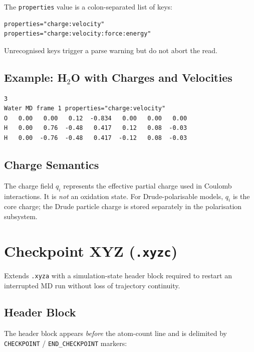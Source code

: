 \documentclass[12pt, a4paper, oneside]{article}
\begin{document}
The \texttt{properties} value is a colon-separated list of keys:

\begin{lstlisting}[language={},frame=single]
properties="charge:velocity"
properties="charge:velocity:force:energy"
\end{lstlisting}

Unrecognised keys trigger a parse warning but do not abort the read.

\subsection{Example: H\texorpdfstring{$_2$}{2}O with Charges and Velocities}

\begin{lstlisting}[language={},frame=single]
3
Water MD frame 1 properties="charge:velocity"
O   0.00   0.00   0.12  -0.834   0.00   0.00   0.00
H   0.00   0.76  -0.48   0.417   0.12   0.08  -0.03
H   0.00  -0.76  -0.48   0.417  -0.12   0.08  -0.03
\end{lstlisting}

\subsection{Charge Semantics}

The charge field $q_i$ represents the effective partial charge used
in Coulomb interactions.  It is \emph{not} an oxidation state.  For
Drude-polarisable models, $q_i$ is the core charge; the Drude
particle charge is stored separately in the polarisation subsystem.

\section{Checkpoint XYZ (\texttt{.xyzc})}
\label{sec:xyzc}

Extends \texttt{.xyza} with a simulation-state header block required
to restart an interrupted MD run without loss of trajectory
continuity.

\subsection{Header Block}

The header block appears \emph{before} the atom-count line and is
delimited by \texttt{CHECKPOINT} / \texttt{END\_CHECKPOINT} markers:
\end{document}
